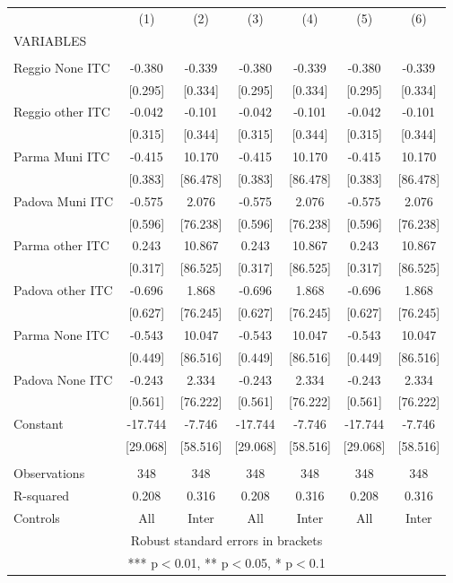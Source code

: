 \begin{tabular}{lcccccc} \hline
 & (1) & (2) & (3) & (4) & (5) & (6) \\
VARIABLES &  &  &  &  &  &  \\ \hline
 &  &  &  &  &  &  \\
Reggio None ITC & -0.380 & -0.339 & -0.380 & -0.339 & -0.380 & -0.339 \\
 & [0.295] & [0.334] & [0.295] & [0.334] & [0.295] & [0.334] \\
Reggio other ITC & -0.042 & -0.101 & -0.042 & -0.101 & -0.042 & -0.101 \\
 & [0.315] & [0.344] & [0.315] & [0.344] & [0.315] & [0.344] \\
Parma Muni ITC & -0.415 & 10.170 & -0.415 & 10.170 & -0.415 & 10.170 \\
 & [0.383] & [86.478] & [0.383] & [86.478] & [0.383] & [86.478] \\
Padova Muni ITC & -0.575 & 2.076 & -0.575 & 2.076 & -0.575 & 2.076 \\
 & [0.596] & [76.238] & [0.596] & [76.238] & [0.596] & [76.238] \\
Parma other ITC & 0.243 & 10.867 & 0.243 & 10.867 & 0.243 & 10.867 \\
 & [0.317] & [86.525] & [0.317] & [86.525] & [0.317] & [86.525] \\
Padova other ITC & -0.696 & 1.868 & -0.696 & 1.868 & -0.696 & 1.868 \\
 & [0.627] & [76.245] & [0.627] & [76.245] & [0.627] & [76.245] \\
Parma None ITC & -0.543 & 10.047 & -0.543 & 10.047 & -0.543 & 10.047 \\
 & [0.449] & [86.516] & [0.449] & [86.516] & [0.449] & [86.516] \\
Padova None ITC & -0.243 & 2.334 & -0.243 & 2.334 & -0.243 & 2.334 \\
 & [0.561] & [76.222] & [0.561] & [76.222] & [0.561] & [76.222] \\
Constant & -17.744 & -7.746 & -17.744 & -7.746 & -17.744 & -7.746 \\
 & [29.068] & [58.516] & [29.068] & [58.516] & [29.068] & [58.516] \\
 &  &  &  &  &  &  \\
Observations & 348 & 348 & 348 & 348 & 348 & 348 \\
R-squared & 0.208 & 0.316 & 0.208 & 0.316 & 0.208 & 0.316 \\
 Controls & All & Inter & All & Inter & All & Inter \\ \hline
\multicolumn{7}{c}{ Robust standard errors in brackets} \\
\multicolumn{7}{c}{ *** p$<$0.01, ** p$<$0.05, * p$<$0.1} \\
\end{tabular}
